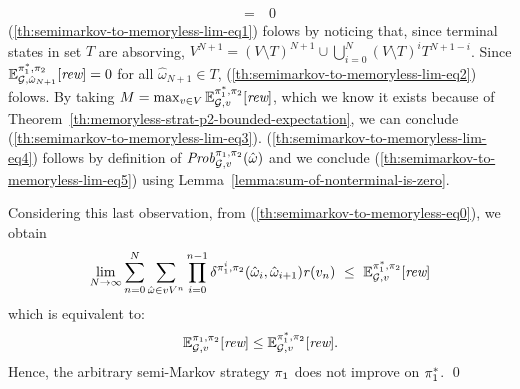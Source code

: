 \begin{myproof}
\begin{align}
    = \ & 0  \label{th:semimarkov-to-memoryless-lim-eq5}
  \end{align}
  (\ref{th:semimarkov-to-memoryless-lim-eq1}) folows by noticing that,
  since terminal states in set $T$ are absorving,
  $V^{N+1}=(V\setminus T)^{N+1}\cup\bigcup_{i=0}^N(V\setminus T)^iT^{N+1-i}$.
  Since
  $\mathbb{E}^{\pi^*_{1}, \pi_{2}}_{\mathcal{G}, \hat{\omega}_{N+1}}[\textit{rew}]=0$
  for all $\hat{\omega}_{N+1}\in T$, (\ref{th:semimarkov-to-memoryless-lim-eq2})
  folows.
  By taking
  $M = \max_{v\in V} \mathbb{E}^{\pi^*_{1}, \pi_{2}}_{\mathcal{G}, v}[\textit{rew}]$,
  which we know it exists because of
  Theorem~\ref{th:memoryless-strat-p2-bounded-expectation}, we can conclude
  (\ref{th:semimarkov-to-memoryless-lim-eq3}).
  (\ref{th:semimarkov-to-memoryless-lim-eq4}) follows by definition of
  $\mathit{Prob}^{\pi_{1}, \pi_{2}}_{\mathcal{G},v}(\hat{\omega})$ and we
  conclude (\ref{th:semimarkov-to-memoryless-lim-eq5}) using
  Lemma~\ref{lemma:sum-of-nonterminal-is-zero}.
  

  Considering this last observation, from
  (\ref{th:semimarkov-to-memoryless-eq0}), we obtain
  \[
  \lim_{N \rightarrow \infty}	\sum^{N}_{n=0}\sum_{\hat{\omega} \in vV^{n}} \prod^{n-1}_{i=0}\delta^{\strat{1}^i,\strat{2}}(\hat{\omega}_i, \hat{\omega}_{i+1}) \reward(v_n) \ \leq \ \Expect{\starredstrat{1}}{\strat{2}}_{\StochG,v}[\Rewards]
  \]
  which  is equivalent to:
  \[
  \mathbb{E}^{\pi_{1}, \pi_{2}}_{\mathcal{G},v}[\textit{rew}] \leq \mathbb{E}^{\pi^*_{1}, \pi_{2}}_{\mathcal{G},v}[\textit{rew}].
  \]
  Hence, the arbitrary semi-Markov strategy $\pi_{1}$ does not improve on $\pi^*_{1}$.
  \qed
\end{myproof}


\else


